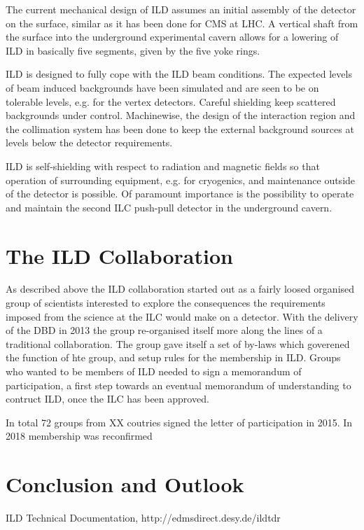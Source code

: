 \documentclass[%
 amsmath,amssymb,
 aps,
]{revtex4-1}
\begin{document}
The current mechanical design of ILD assumes an initial assembly of the detector on the surface, similar as it has been done for CMS at LHC. A vertical shaft from the surface into the underground experimental cavern allows for a lowering of ILD in basically five segments, given by the five yoke rings.

ILD is designed to fully cope with the ILD beam conditions. The expected levels of beam induced backgrounds have been simulated and are seen to be on tolerable levels, e.g. for the vertex detectors. Careful shielding keep scattered backgrounds under control. Machinewise, the design of the interaction region and the collimation system has been done to keep the external background sources at levels below the detector requirements.

ILD is self-shielding with respect to radiation and magnetic fields so that operation of surrounding equipment, e.g. for cryogenics, and maintenance outside of the detector is possible. Of paramount importance is the possibility to operate and maintain the second ILC push-pull detector in the underground cavern.

\section{The ILD Collaboration}
As described above the ILD collaboration started out as a fairly loosed organised group of scientists interested to explore the consequences the requirements imposed from the science at the ILC would make on a detector. With the delivery of the DBD in 2013 the group re-organised itself more along the lines of a traditional collaboration. The group gave itself a set of by-laws which goverened the function of hte group, and setup rules for the membership in ILD. Groups who wanted to be members of ILD needed to sign a memorandum of participation, a first step towards an eventual memorandum of understanding to contruct ILD, once the ILC has been approved. 

In total 72 groups from XX coutries signed the letter of participation in 2015. In 2018 membership was reconfirmed 



\section{Conclusion and Outlook}

\begin{thebibliography}{}
 ILD Technical Documentation, http://edmsdirect.desy.de/ildtdr

\end{thebibliography}
\end{document}
